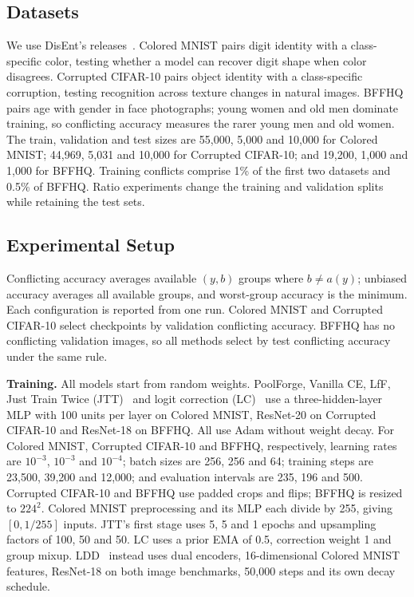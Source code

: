 \documentclass[10pt,twocolumn,letterpaper]{article}
\begin{document}
\subsection{Datasets}
We use DisEnt's releases~\cite{lee2021ldd}. Colored MNIST pairs digit identity with a class-specific color, testing whether a model can recover digit shape when color disagrees. Corrupted CIFAR-10 pairs object identity with a class-specific corruption, testing recognition across texture changes in natural images. BFFHQ pairs age with gender in face photographs; young women and old men dominate training, so conflicting accuracy measures the rarer young men and old women. The train, validation and test sizes are 55,000, 5,000 and 10,000 for Colored MNIST; 44,969, 5,031 and 10,000 for Corrupted CIFAR-10; and 19,200, 1,000 and 1,000 for BFFHQ. Training conflicts comprise 1\% of the first two datasets and 0.5\% of BFFHQ. Ratio experiments change the training and validation splits while retaining the test sets.

\subsection{Experimental Setup}
Conflicting accuracy averages available $(y,b)$ groups where $b\ne a(y)$; unbiased accuracy averages all available groups, and worst-group accuracy is the minimum. Each configuration is reported from one run. Colored MNIST and Corrupted CIFAR-10 select checkpoints by validation conflicting accuracy. BFFHQ has no conflicting validation images, so all methods select by test conflicting accuracy under the same rule.

\textbf{Training.} All models start from random weights. PoolForge, Vanilla CE, LfF, Just Train Twice (JTT)~\cite{liu2021jtt} and logit correction (LC)~\cite{liu2023lc} use a three-hidden-layer MLP with 100 units per layer on Colored MNIST, ResNet-20 on Corrupted CIFAR-10 and ResNet-18 on BFFHQ. All use Adam without weight decay. For Colored MNIST, Corrupted CIFAR-10 and BFFHQ, respectively, learning rates are $10^{-3}$, $10^{-3}$ and $10^{-4}$; batch sizes are 256, 256 and 64; training steps are 23,500, 39,200 and 12,000; and evaluation intervals are 235, 196 and 500. Corrupted CIFAR-10 and BFFHQ use padded crops and flips; BFFHQ is resized to $224^2$. Colored MNIST preprocessing and its MLP each divide by 255, giving $[0,1/255]$ inputs. JTT's first stage uses 5, 5 and 1 epochs and upsampling factors of 100, 50 and 50. LC uses a prior EMA of 0.5, correction weight 1 and group mixup. LDD~\cite{lee2021ldd} instead uses dual encoders, 16-dimensional Colored MNIST features, ResNet-18 on both image benchmarks, 50,000 steps and its own decay schedule.
\end{document}
